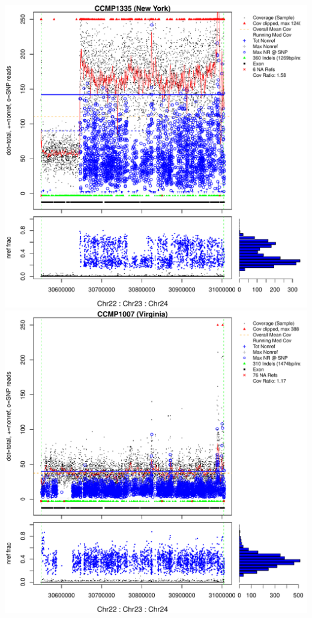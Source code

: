 \documentclass{article}\usepackage[]{graphicx}\usepackage[]{color}
\makeatletter
\def\maxwidth{ %
  \ifdim\Gin@nat@width>\linewidth
    \linewidth
  \else
    \Gin@nat@width
  \fi
}
\newenvironment{knitrout}{}{} %
\makeatother
\begin{document}
\begin{knitrout}
{\centering \includegraphics[width=\maxwidth]{figs-knitr/unnamed-chunk-42-1} 
\includegraphics[width=\maxwidth]{figs-knitr/unnamed-chunk-42-2} 
}
\end{knitrout}
\end{document}

